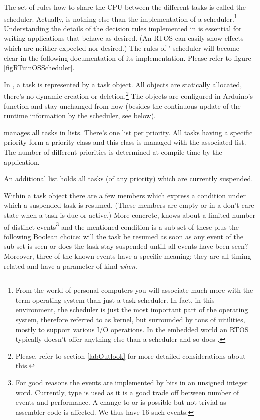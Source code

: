 The set of rules how to share the CPU between the different tasks is
called the scheduler. Actually, \rtos{} is nothing else than the
implementation of a scheduler.\footnote{From the world of personal
computers you will associate much more with the term operating system than
just a task scheduler. In fact, in this environment, the scheduler is just
the most important part of the operating system, therefore referred to as
kernel, but surrounded by tons of uitilities, mostly to support various
I/O operations. In the embedded world an RTOS typically doesn't offer
anything else than a scheduler and so does \rtos{}.} Understanding the
details of the decision rules implemented in \rtos{} is essential for
writing applications that behave as desired. (An RTOS can easily show
effects which are neither expected nor desired.) The rules of \rtos'
scheduler will become clear in the following documentation of its
implementation. Please refer to figure \ref{figRTuinOSScheduler}.


In \rtos{}, a task is represented by a task object. All objects are
statically allocated, there's no dynamic creation or
deletion.\footnote{Please, refer to section \ref{labOutlook} for more
detailed considerations about this.} The objects are configured in
Arduino's function  and stay unchanged from now (besides the
continuous update of the runtime information by the scheduler, see below).

\rtos{} manages all tasks in lists. There's one list per priority. All
tasks having a specific priority form a priority class and this class is
managed with the associated list. The number of different priorities is
determined at compile time by the application.

An additional list holds all tasks (of any priority) which are currently
suspended.

Within a task object there are a few members which express a condition
under which a suspended task is resumed. (These members are empty or in a
don't care state when a task is due or active.) More concrete, \rtos{}
knows about a limited number of distinct events\footnote{For good reasons
the events are implemented by bits in an unsigned integer word. Currently,
type  is used as it is a good trade off between number
of events and performance. A change to  or
 is possible but not trivial as assembler code is
affected. We thus have 16 such events.} and the mentioned condition is a
sub-set of these plus the following Boolean choice: will the task be
resumed as soon as any event of the sub-set is seen or does the task stay
suspended untill all events have been seen? Moreover, three of the known
events have a specific meaning; they are all timing related and have a
parameter of kind \emph{when}.

